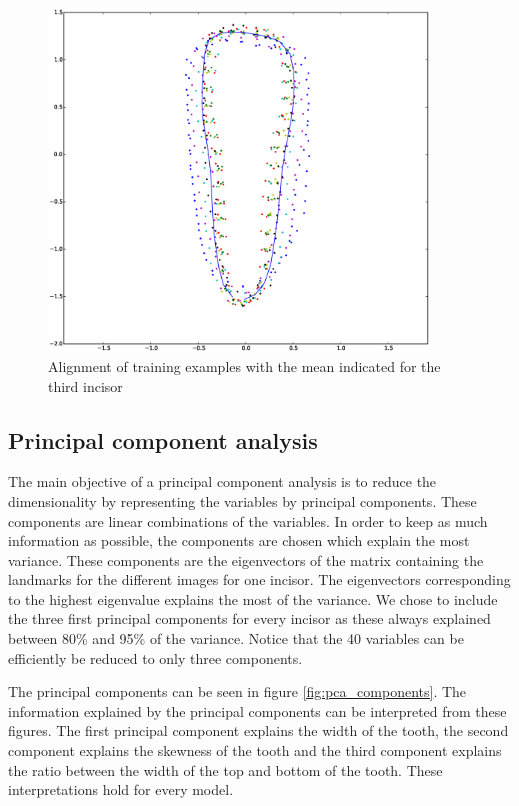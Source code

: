 \documentclass[a4paper,10pt]{article}
\begin{document}
\begin{figure}[htbp]
	\centering
	\includegraphics[width=0.9\textwidth, trim=0cm 2.5cm 0cm 3cm, clip]{procrustes_single_tooth}
	\caption{Alignment of training examples with the mean indicated for the third incisor}
	\label{fig:procrustes_single_tooth}
\end{figure}

\subsection{Principal component analysis}
The main objective of a principal component analysis is to reduce the dimensionality by representing the variables by principal components. These components are linear combinations of the variables. In order to keep as much information as possible, the components are chosen which explain the most variance. These components are the eigenvectors of the matrix containing the landmarks for the different images for one incisor. The eigenvectors corresponding to the highest eigenvalue explains the most of the variance. We chose to include the three first principal components for every incisor as these always explained between 80\% and 95\% of the variance. Notice that the 40 variables can be efficiently be reduced to only three components.

The principal components can be seen in figure \ref{fig:pca_components}. The information explained by the principal components can be interpreted from these figures. The first principal component explains the width of the tooth, the second component explains the skewness of the tooth and the third component explains the ratio between the width of the top and bottom of the tooth. These interpretations hold for every model.
\end{document}
